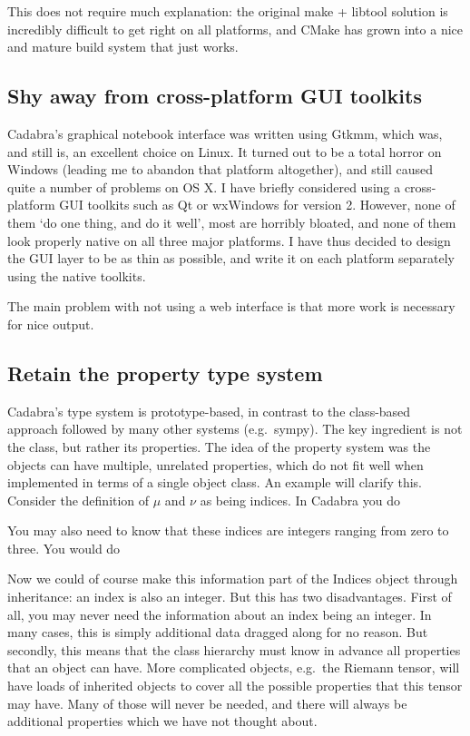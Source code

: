 \documentclass[11pt]{article}
\begin{document}
This does not require much explanation: the original make + libtool
solution is incredibly difficult to get right on all platforms, and
CMake has grown into a nice and mature build system that just works.

\subsection{Shy away from cross-platform GUI toolkits}

Cadabra's graphical notebook interface was written using Gtkmm, which
was, and still is, an excellent choice on Linux. It turned out to be a
total horror on Windows (leading me to abandon that platform
altogether), and still caused quite a number of problems on OS X.  I
have briefly considered using a cross-platform GUI toolkits such as Qt
or wxWindows for version 2. However, none of them `do one thing, and
do it well', most are horribly bloated, and none of them look properly
native on all three major platforms. I have thus decided to design the
GUI layer to be as thin as possible, and write it on each platform
separately using the native toolkits.

The main problem with not using a web interface is that more work is
necessary for nice output. 

\subsection{Retain the property type system}

Cadabra's type system is prototype-based, in contrast to the
class-based approach followed by many other systems (e.g.~sympy). 
The key ingredient is not the class, but rather its properties.
The idea of the property system was the objects can have multiple,
unrelated properties, which do not fit well when implemented in terms
of a single object class. An example will clarify this. Consider the
definition of $\mu$ and $\nu$ as being indices. In Cadabra you do
\begin{quote}
\end{quote}
You may also need to know that these indices are integers ranging from
zero to three. You would do
\begin{quote}
\end{quote}
Now we could of course make this information part of the Indices
object through inheritance: an index is also an integer. But this has
two disadvantages. First of all, you may never need the information
about an index being an integer. In many cases, this is simply
additional data dragged along for no reason. But secondly, this means
that the class hierarchy must know in advance all properties that an
object can have. More complicated objects, e.g.~the Riemann tensor,
will have loads of inherited objects to cover all the possible
properties that this tensor may have. Many of those will never be
needed, and there will always be additional properties which we have
not thought about. 
\end{document}
